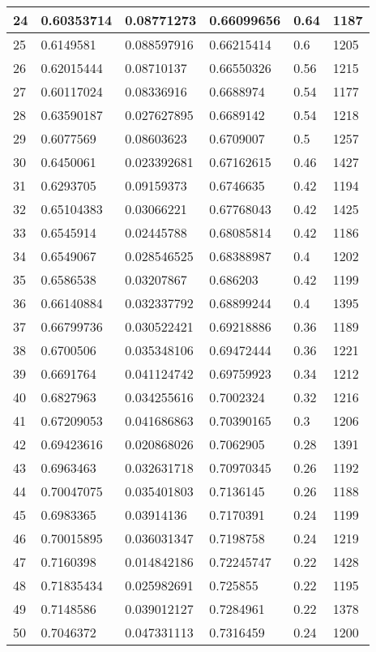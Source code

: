 \begin{longtable}{|l|l|l|l|l|l|}
24 & 0.60353714 & 0.08771273 & 0.66099656 & 0.64 & 1187 \\ \hline 
25 & 0.6149581 & 0.088597916 & 0.66215414 & 0.6 & 1205 \\ \hline 
26 & 0.62015444 & 0.08710137 & 0.66550326 & 0.56 & 1215 \\ \hline 
27 & 0.60117024 & 0.08336916 & 0.6688974 & 0.54 & 1177 \\ \hline 
28 & 0.63590187 & 0.027627895 & 0.6689142 & 0.54 & 1218 \\ \hline 
29 & 0.6077569 & 0.08603623 & 0.6709007 & 0.5 & 1257 \\ \hline 
30 & 0.6450061 & 0.023392681 & 0.67162615 & 0.46 & 1427 \\ \hline 
31 & 0.6293705 & 0.09159373 & 0.6746635 & 0.42 & 1194 \\ \hline 
32 & 0.65104383 & 0.03066221 & 0.67768043 & 0.42 & 1425 \\ \hline 
33 & 0.6545914 & 0.02445788 & 0.68085814 & 0.42 & 1186 \\ \hline 
34 & 0.6549067 & 0.028546525 & 0.68388987 & 0.4 & 1202 \\ \hline 
35 & 0.6586538 & 0.03207867 & 0.686203 & 0.42 & 1199 \\ \hline 
36 & 0.66140884 & 0.032337792 & 0.68899244 & 0.4 & 1395 \\ \hline 
37 & 0.66799736 & 0.030522421 & 0.69218886 & 0.36 & 1189 \\ \hline 
38 & 0.6700506 & 0.035348106 & 0.69472444 & 0.36 & 1221 \\ \hline 
39 & 0.6691764 & 0.041124742 & 0.69759923 & 0.34 & 1212 \\ \hline 
40 & 0.6827963 & 0.034255616 & 0.7002324 & 0.32 & 1216 \\ \hline 
41 & 0.67209053 & 0.041686863 & 0.70390165 & 0.3 & 1206 \\ \hline 
42 & 0.69423616 & 0.020868026 & 0.7062905 & 0.28 & 1391 \\ \hline 
43 & 0.6963463 & 0.032631718 & 0.70970345 & 0.26 & 1192 \\ \hline 
44 & 0.70047075 & 0.035401803 & 0.7136145 & 0.26 & 1188 \\ \hline 
45 & 0.6983365 & 0.03914136 & 0.7170391 & 0.24 & 1199 \\ \hline 
46 & 0.70015895 & 0.036031347 & 0.7198758 & 0.24 & 1219 \\ \hline 
47 & 0.7160398 & 0.014842186 & 0.72245747 & 0.22 & 1428 \\ \hline 
48 & 0.71835434 & 0.025982691 & 0.725855 & 0.22 & 1195 \\ \hline 
49 & 0.7148586 & 0.039012127 & 0.7284961 & 0.22 & 1378 \\ \hline 
50 & 0.7046372 & 0.047331113 & 0.7316459 & 0.24 & 1200 \\ \hline 
\end{longtable}